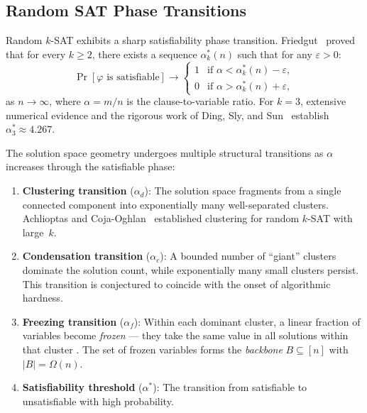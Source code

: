 \documentclass[11pt]{article}
\theoremstyle{definition}
\theoremstyle{remark}
\begin{document}
\subsection{Random SAT Phase Transitions}

Random $k$-SAT exhibits a sharp satisfiability phase transition.
Friedgut~\cite{Friedgut99} proved that for every $k \geq 2$, there exists
a sequence $\alpha_k^*(n)$ such that for any $\varepsilon > 0$:
\[
  \Pr[\varphi \text{ is satisfiable}] \to
  \begin{cases}
    1 & \text{if } \alpha < \alpha_k^*(n) - \varepsilon, \\
    0 & \text{if } \alpha > \alpha_k^*(n) + \varepsilon,
  \end{cases}
\]
as $n \to \infty$, where $\alpha = m/n$ is the clause-to-variable ratio.
For $k = 3$, extensive numerical evidence and the rigorous work of
Ding, Sly, and Sun~\cite{DSS15} establish $\alpha_3^* \approx 4.267$.

The solution space geometry undergoes multiple structural transitions
as $\alpha$ increases through the satisfiable phase:

\begin{enumerate}[label=(\roman*),nosep]
  \item \textbf{Clustering transition} ($\alpha_d$): The solution space
    fragments from a single connected component into exponentially many
    well-separated clusters.  Achlioptas and Coja-Oghlan~\cite{ART}
    established clustering for random $k$-SAT with large~$k$.

  \item \textbf{Condensation transition} ($\alpha_c$): A bounded number of
    ``giant'' clusters dominate the solution count, while exponentially many
    small clusters persist.  This transition is conjectured to coincide
    with the onset of algorithmic hardness.

  \item \textbf{Freezing transition} ($\alpha_f$): Within each dominant
    cluster, a linear fraction of variables become \emph{frozen} ---
    they take the same value in all solutions within that cluster
    \cite{Ding15}.
    The set of frozen variables forms the \emph{backbone}
    $B \subseteq [n]$ with $|B| = \Omega(n)$.

  \item \textbf{Satisfiability threshold} ($\alpha^*$): The transition
    from satisfiable to unsatisfiable with high probability.
\end{enumerate}
\end{document}
